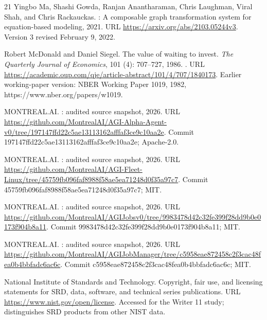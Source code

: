 \documentclass[11pt,letterpaper]{article}
\begin{document}
\begin{thebibliography}{21}
Yingbo Ma, Shashi Gowda, Ranjan Anantharaman, Chris Laughman, Viral Shah, and
  Chris Rackauckas.
: A composable graph transformation system for
  equation-based modeling, 2021.
\newblock URL \url{https://arxiv.org/abs/2103.05244v3}.
\newblock Version 3 revised February 9, 2022.

Robert McDonald and Daniel Siegel.
\newblock The value of waiting to invest.
\newblock \emph{The Quarterly Journal of Economics}, 101 (4):
  707--727, 1986.
\newblock {}.
\newblock URL
  \url{https://academic.oup.com/qje/article-abstract/101/4/707/1840173}.
\newblock Earlier working-paper version: NBER Working Paper 1019, 1982,
  https://www.nber.org/papers/w1019.

{MONTREAL.AI}.
: audited source snapshot, 2026{}.
\newblock URL
  \url{https://github.com/MontrealAI/AGI-Alpha-Agent-v0/tree/197147ffd22c5ae13113162afffaf3ce9c10aa2e}.
\newblock Commit 197147ffd22c5ae13113162afffaf3ce9c10aa2e; Apache-2.0.

{MONTREAL.AI}.
: audited source snapshot, 2026{}.
\newblock URL
  \url{https://github.com/MontrealAI/AGI-Fleet-Linux/tree/45759fb096faf8988f58ae5ea71248d0f35a97c7}.
\newblock Commit 45759fb096faf8988f58ae5ea71248d0f35a97c7; MIT.

{MONTREAL.AI}.
: audited source snapshot, 2026{}.
\newblock URL
  \url{https://github.com/MontrealAI/AGIJobsv0/tree/9983478d42c32fe399f28dd9b0e0173f904b8a11}.
\newblock Commit 9983478d42c32fe399f28dd9b0e0173f904b8a11; MIT.

{MONTREAL.AI}.
: audited source snapshot, 2026{}.
\newblock URL
  \url{https://github.com/MontrealAI/AGIJobManager/tree/c5958eae872458c2f3cac48fea0b4bbfadc6ac6c}.
\newblock Commit c5958eae872458c2f3cac48fea0b4bbfadc6ac6c; MIT.

{National Institute of Standards and Technology}.
\newblock Copyright, fair use, and licensing statements for {SRD}, data,
  software, and technical series publications.
\newblock URL \url{https://www.nist.gov/open/license}.
\newblock Accessed for the Writer 11 study; distinguishes SRD products from
  other NIST data.


\end{thebibliography}
\end{document}
